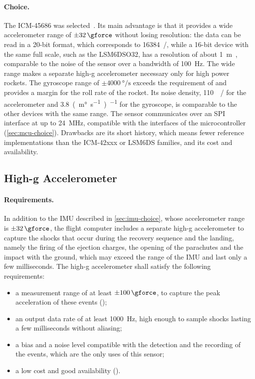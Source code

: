 \paragraph{Choice.} The ICM-45686 was selected~\cite{icm45686:datasheet}. Its main advantage is that it provides a wide accelerometer range of $\pm\SI{32}{\gforce}$ without losing resolution: the data can be read in a 20-bit format, which corresponds to \SI{16384}{\lsb/\gforce}, while a 16-bit device with the same full scale, such as the LSM6DSO32, has a resolution of about \SI{1}{m\gforce}, comparable to the noise of the sensor over a bandwidth of \SI{100}{Hz}. The wide range makes a separate high-g accelerometer necessary only for high power rockets. The gyroscope range of $\pm\SI{4000}{\degree/\second}$ exceeds the requirement of  and provides a margin for the roll rate of the rocket. Its noise density, \SI{110}{\micro\gforce/\rthz} for the accelerometer and \SI{3.8}{(\milli\degree\per\second)\per\sqrt{\Hz}} for the gyroscope, is comparable to the other devices with the same range. The sensor communicates over an SPI interface at up to \SI{24}{MHz}, compatible with the interfaces of the microcontroller (\cref{sec:mcu-choice}). Drawbacks are its short history, which means fewer reference implementations than the ICM-42xxx or LSM6DS families, and its cost and availability.

\subsection{High-g Accelerometer}
\label{sec:high-g-choice}

\paragraph{Requirements.} In addition to the IMU described in \cref{sec:imu-choice}, whose accelerometer range is $\pm\SI{32}{\gforce}$, the flight computer includes a separate high-g accelerometer to capture the shocks that occur during the recovery sequence and the landing, namely the firing of the ejection charges, the opening of the parachutes and the impact with the ground, which may exceed the range of the IMU and last only a few milliseconds. The high-g accelerometer shall satisfy the following requirements:
\begin{itemize}
    \item a measurement range of at least $\pm\SI{100}{\gforce}$, to capture the peak acceleration of these events ();
    \item an output data rate of at least \SI{1000}{Hz}, high enough to sample shocks lasting a few milliseconds without aliasing;
    \item a bias and a noise level compatible with the detection and the recording of the events, which are the only uses of this sensor;
    \item a low cost and good availability ().
\end{itemize}

